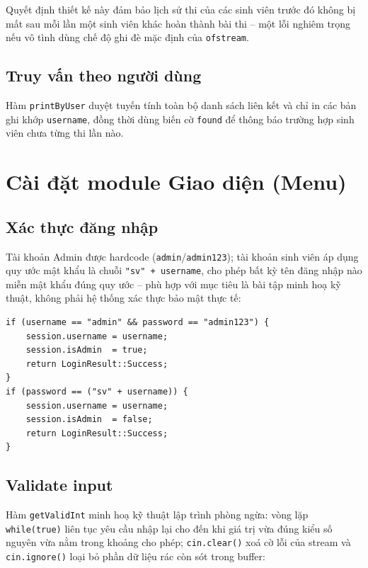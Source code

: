 \documentclass[11pt]{report}
\begin{document}
Quyết định thiết kế này đảm bảo lịch sử thi của các sinh viên trước đó không bị mất sau mỗi lần một sinh viên khác hoàn thành bài thi -- một lỗi nghiêm trọng nếu vô tình dùng chế độ ghi đè mặc định của \texttt{ofstream}.

\subsection{Truy vấn theo người dùng}

Hàm \texttt{printByUser} duyệt tuyến tính toàn bộ danh sách liên kết và chỉ in các bản ghi khớp \texttt{username}, đồng thời dùng biến cờ \texttt{found} để thông báo trường hợp sinh viên chưa từng thi lần nào.

\section{Cài đặt module Giao diện (Menu)}

\subsection{Xác thực đăng nhập}

Tài khoản Admin được hardcode (\texttt{admin}/\texttt{admin123}); tài khoản sinh viên áp dụng quy ước mật khẩu là chuỗi \texttt{"sv" + username}, cho phép bất kỳ tên đăng nhập nào miễn mật khẩu đúng quy ước -- phù hợp với mục tiêu là bài tập minh hoạ kỹ thuật, không phải hệ thống xác thực bảo mật thực tế:

\begin{lstlisting}[caption={Xác thực đăng nhập (Menu.cpp)}, label={lst:login}]
if (username == "admin" && password == "admin123") {
    session.username = username;
    session.isAdmin  = true;
    return LoginResult::Success;
}
if (password == ("sv" + username)) {
    session.username = username;
    session.isAdmin  = false;
    return LoginResult::Success;
}
\end{lstlisting}

\subsection{Validate input}

Hàm \texttt{getValidInt} minh hoạ kỹ thuật lập trình phòng ngừa: vòng lặp \texttt{while(true)} liên tục yêu cầu nhập lại cho đến khi giá trị vừa đúng kiểu số nguyên vừa nằm trong khoảng cho phép; \texttt{cin.clear()} xoá cờ lỗi của stream và \texttt{cin.ignore()} loại bỏ phần dữ liệu rác còn sót trong buffer:
\end{document}
